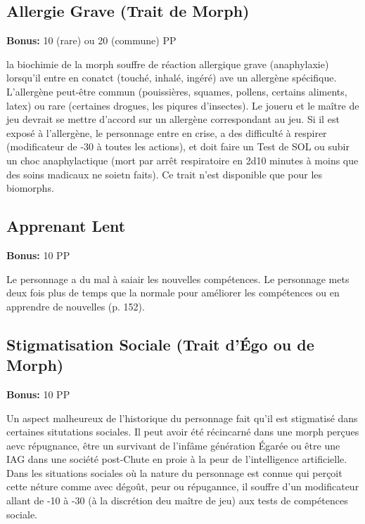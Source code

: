 \subsection{Allergie Grave (Trait de Morph)} \label{sec:traits-severe-allergy} 

\textbf{Bonus:} 10 (rare) ou 20 (commune) PP 

la biochimie de la morph souffre de réaction allergique grave (anaphylaxie) lorsqu'il entre en conatct (touché, inhalé, ingéré) ave un allergène spécifique. L'allergène peut-être commun (pouissières, squames, pollens, certains aliments, latex) ou rare (certaines drogues, les piqures d'insectes). Le joueru et le maître de jeu devrait se mettre d'accord sur un allergène correspondant au jeu. Si il est exposé à l'allergène, le personnage entre en crise, a des difficulté à respirer (modificateur de -30 à toutes les actions), et doit faire un Test de SOL ou subir un choc anaphylactique (mort par arrêt respiratoire en 2d10 minutes à moins que des soins madicaux ne soietn faits). Ce trait n'est disponible que pour les biomorphs. 

\subsection{Apprenant Lent} \label{sec:traits-slow-learner} 

\textbf{Bonus:} 10 PP 

Le personnage a du mal à saiair les nouvelles compétences. Le personnage mets deux fois plus de temps que la normale pour améliorer les compétences ou en apprendre de nouvelles (p. 152). 

\subsection{Stigmatisation Sociale (Trait d'Égo ou de Morph)} \label{sec:traits-social-stigma} 

\textbf{Bonus:} 10 PP 

Un aspect malheureux de l'historique du personnage fait qu'il est stigmatisé dans certaines situtations sociales. Il peut avoir été récincarné dans une morph perçues aevc répugnance, être un survivant de l'infâme génération Égarée ou être une IAG dans une société post-Chute en proie à la peur de l'intelligence artificielle. Dans les situations sociales où la nature du personnage est connue qui perçoit cette néture comme avec dégoût, peur ou répugannce, il souffre d'un modificateur allant de -10 à -30 (à la discrétion deu maître de jeu) aux tests de compétences sociale. 

